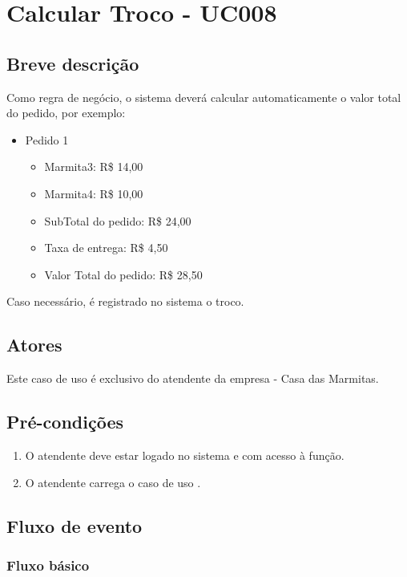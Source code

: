 \chapter{Calcular Troco - UC008} \label{uc008}

\section{Breve descrição}

Como regra de negócio, o sistema deverá calcular automaticamente o valor total do pedido, por exemplo:

\begin{itemize}
	\item Pedido 1
	\begin{itemize}
		\item Marmita3: R\$ 14,00
		\item Marmita4: R\$ 10,00
		\item SubTotal do pedido: R\$ 24,00
		\item Taxa de entrega: R\$ 4,50
		\item Valor Total do pedido: R\$ 28,50
	\end{itemize}
\end{itemize}

Caso necessário, é registrado no sistema o troco.

\section{Atores}

Este caso de uso é exclusivo do atendente da empresa - Casa das Marmitas.

\section{Pré-condições}

\begin{enumerate}
	\item O atendente deve estar logado no sistema e com acesso à função.
	\item O atendente carrega o caso de uso .
\end{enumerate}

\section{Fluxo de evento}

\subsection{Fluxo básico}

